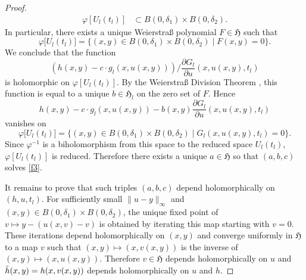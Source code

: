 \documentclass[11pt,twoside]{amsart}
\theoremstyle{plain}
\begin{document}
\begin{proof}
\begin{align}
\varphi[U_l(t_l)]&\subset B(0,\delta_1)\times B(0,\delta_2).
\end{align}
In particular, there exists a unique Weierstra{\ss} polynomial $F\in\mathfrak{H}$ such that
\[ \varphi\big[U_l(t_l)\big]  =\big\{(x,y)\in B(0,\delta_1)\times B(0,\delta_2)\mid F(x,y)=0\big\}.\]
 We conclude that the function
\begin{equation}\label{eq:b}
\left(h(x,y)-c\cdot g_l(x,u(x,y))\right)\big/\frac{\partial G_l}{\partial u}(x,u(x,y),t_l)
\end{equation}
is holomorphic on $ \varphi[U_l (t_l)] $. By the Weierstra{\ss} Division Theorem \cite[Chapter I Theorem 1.1]{PR:94}, this function is equal to a unique $b\in\mathfrak {H}_l $ on the zero set of $F$. Hence
$$h(x,y)-c\cdot g_l(x,u(x,y))-b(x,y)\frac{\partial G_l}{\partial u}(x,u(x,y),t_l)$$
vanishes on 
$$\varphi\big[U_l (t_l)\big]=\big\{(x,y)\in B(0,\delta_1)\times B(0,\delta_2)\mid G_l(x,u(x,y),t_l)=0\big\}.$$
Since $ \varphi ^ {- 1} $ is a biholomorphism from this space
to the reduced space $ U_l (t_l) $, %
$\varphi[U_l (t_l)] $ is reduced. Therefore there exists a unique  $a\in\mathfrak {H}$ so that $ (a, b, c) $ solves \eqref{f3}.

It remains to prove that such triples $(a,b,c)$ depend holomorphically on $(h,u,t_l)$. For sufficiently small $\|u-y\|_\infty$ and $(x,y)\in B(0,\delta_1)\times B(0,\delta_2)$, the unique fixed point of $v\mapsto y-(u(x,v)-v)$ is obtained by iterating this map starting with $v=0$. These iterations depend holomorphically on $(x,y)$ and converge uniformly in $\mathfrak {H}$ to a map $v$ such that $(x,y)\mapsto(x,v(x,y))$ is the inverse of $(x,y)\mapsto(x,u(x,y))$. Therefore $v\in\mathfrak {H}$ depends holomorphically on $u$ and $\Tilde{h}(x,y)=h(x,v(x,y))$ depends holomorphically on $u$ and $h$.


\end{proof}
\end{document}

